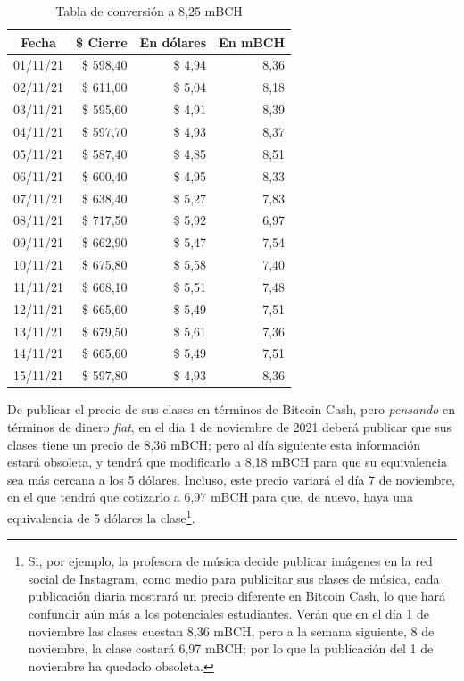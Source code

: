 \documentclass[12pt,a4paper,twoside]{book}
\begin{document}
\begin{longtable}{|c|r|r|r|}
\caption{Tabla de conversión a 8,25 mBCH} \\
\hline
\textbf{Fecha} & \textbf{\$ Cierre} & \textbf{En dólares} & \textbf{En mBCH} \\ 
\hline
01/11/21 & \$ 598,40 & \$ 4,94 & 8,36 \\ 
\hline
02/11/21 & \$ 611,00 & \$ 5,04 & 8,18 \\ 
\hline
03/11/21 & \$ 595,60 & \$ 4,91 & 8,39 \\ 
\hline
04/11/21 & \$ 597,70 & \$ 4,93 & 8,37 \\ 
\hline
05/11/21 & \$ 587,40 & \$ 4,85 & 8,51 \\ 
\hline
06/11/21 & \$ 600,40 & \$ 4,95 & 8,33 \\ 
\hline
07/11/21 & \$ 638,40 & \$ 5,27 & 7,83 \\ 
\hline
08/11/21 & \$ 717,50 & \$ 5,92 & 6,97 \\ 
\hline
09/11/21 & \$ 662,90 & \$ 5,47 & 7,54 \\ 
\hline
10/11/21 & \$ 675,80 & \$ 5,58 & 7,40 \\ 
\hline
11/11/21 & \$ 668,10 & \$ 5,51 & 7,48 \\ 
\hline
12/11/21 & \$ 665,60 & \$ 5,49 & 7,51 \\ 
\hline
13/11/21 & \$ 679,50 & \$ 5,61 & 7,36 \\ 
\hline
14/11/21 & \$ 665,60 & \$ 5,49 & 7,51 \\ 
\hline
15/11/21 & \$ 597,80 & \$ 4,93 & 8,36 \\ 
\hline
\end{longtable}

De publicar el precio de sus clases en términos de Bitcoin Cash, pero \textit{pensando} en términos de dinero \textit{fiat}, en el día 1 de noviembre de 2021 deberá publicar que sus clases tiene un precio de 8,36 mBCH; pero al día siguiente esta información estará obsoleta, y tendrá que modificarlo a 8,18 mBCH para que su equivalencia sea más cercana a los 5 dólares. Incluso, este precio variará el día 7 de noviembre, en el que tendrá que cotizarlo a 6,97 mBCH para que, de nuevo, haya una equivalencia de 5 dólares la clase\footnote{Si, por ejemplo, la profesora de música decide publicar imágenes en la red social de Instagram, como medio para publicitar sus clases de música, cada publicación diaria mostrará un precio diferente en Bitcoin Cash, lo que hará confundir aún más a los potenciales estudiantes. Verán que en el día 1 de noviembre las clases cuestan 8,36 mBCH, pero a la semana siguiente, 8 de noviembre, la clase costará 6,97 mBCH; por lo que la publicación del 1 de noviembre ha quedado obsoleta.}.
\end{document}
